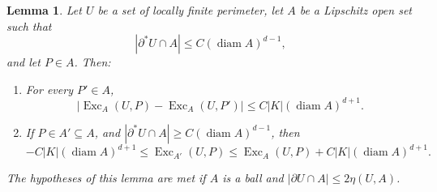 \documentclass[reqno,10pt]{amsart}
\DeclareMathOperator{\diam}{diam}
\DeclareMathOperator{\Exc}{Exc}
\newtheorem{lemma}[theorem]{Lemma}
\theoremstyle{definition}
\numberwithin{equation}{section}
\begin{document}
\begin{lemma}
Let $U$ be a set of locally finite perimeter, let $A$ be a Lipschitz open set such that
$$|\partial^* U \cap A| \leq C(\diam A)^{d - 1},$$
and let $P \in A$. Then:
\begin{enumerate}
\item For every $P' \in A$,
\begin{equation}\label{translation invariance}
|\Exc_A(U, P) - \Exc_A(U, P')| \leq C|K|(\diam A)^{d + 1}.
\end{equation}
\item If $P \in A' \subseteq A$, and $|\partial^* U \cap A| \geq C(\diam A)^{d - 1}$, then
\begin{equation}\label{approximate monotone}
-C |K| (\diam A)^{d + 1} \leq \Exc_{A'}(U, P) \leq \Exc_A(U, P) + C |K|(\diam A)^{d + 1}.
\end{equation}
\end{enumerate}
The hypotheses of this lemma are met if $A$ is a ball and $|\partial U \cap A| \leq 2\eta(U, A)$.
\end{lemma}
\end{document}
